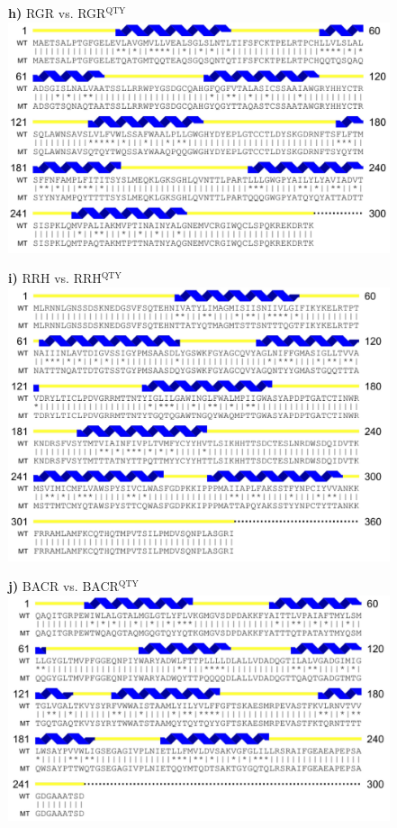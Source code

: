 \documentclass[fleqn,12pt]{supp}
\begin{document}
\newpage
\begin{figure}[H]
    \textbf{h)} RGR vs. RGR$^{\textrm{QTY}}$ \\
    \includegraphics[width=\linewidth]{SuppFigures/rgr.jpg}
\end{figure}

\newpage
\begin{figure}[H]
    \textbf{i)} RRH vs. RRH$^{\textrm{QTY}}$ \\
    \includegraphics[width=\linewidth]{SuppFigures/rrh.jpg}
\end{figure}

\newpage
\begin{figure}[H]
    \textbf{j)} BACR vs. BACR$^{\textrm{QTY}}$ \\
    \includegraphics[width=\linewidth]{SuppFigures/bacr.jpg}
\end{figure}
\end{document}

